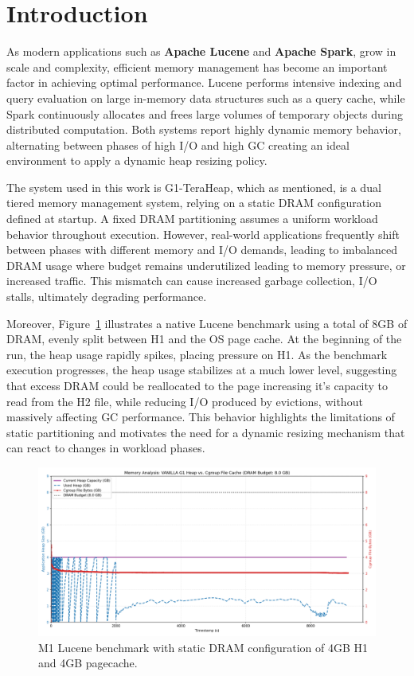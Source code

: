 \section{Introduction}

As modern applications such as \textbf{Apache Lucene} \cite{klinaftakis2025thesis} and \textbf{Apache Spark},
grow in scale and complexity, efficient memory management 
has become an important factor in achieving optimal performance.
Lucene performs intensive indexing and query evaluation on large in-memory
data structures such as a query cache, while Spark continuously allocates and frees large volumes of temporary 
objects during distributed computation. Both systems report highly dynamic memory behavior,
alternating between phases of high I/O and high GC creating an ideal environment to apply 
a dynamic heap resizing policy.

The system used in this work is G1-TeraHeap, which as mentioned, is a dual tiered memory management system,
relying on a static DRAM configuration defined at startup. 
A fixed DRAM partitioning assumes a uniform workload behavior throughout execution. However, real-world applications 
frequently shift between phases with different memory and I/O demands, leading to imbalanced DRAM usage where 
budget remains underutilized leading to memory pressure, or increased traffic.
This mismatch can cause increased garbage  collection, I/O stalls, ultimately degrading performance.

Moreover, Figure~\ref{fig:vanilla-dram-underutilization} illustrates a native Lucene benchmark using a total of 8GB
of DRAM, evenly split between H1 and the OS page cache. At the beginning of the run, the heap usage rapidly spikes, 
placing pressure on H1. As the benchmark execution progresses, the heap 
usage stabilizes at a much lower level, suggesting that excess DRAM could be reallocated to the page increasing it's
capacity to read from the H2 file, while reducing I/O produced by evictions, without massively
affecting GC performance. This behavior highlights the limitations of static partitioning and motivates the need for a 
dynamic resizing mechanism that can react to changes in workload phases.
\begin{figure}[htbp]
  \centering
  \includegraphics[width=1\linewidth]{fig/combined_memory_timeline_vanilla_g1.png}
  \caption{
    M1 Lucene benchmark with static DRAM configuration of 4GB H1 and 4GB pagecache.
  }
  \label{fig:vanilla-dram-underutilization}
  \end{figure}

